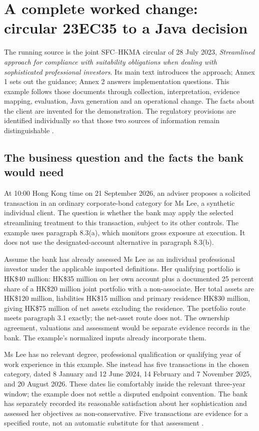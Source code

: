\section{A complete worked change: circular 23EC35 to a Java decision}
\label{sec:dry-run}

The running source is the joint SFC--HKMA circular of 28 July 2023,
\emph{Streamlined approach for compliance with suitability obligations when
dealing with sophisticated professional investors}. Its main text introduces
the approach; Annex 1 sets out the guidance; Annex 2 answers implementation
questions. This example follows those documents through collection,
interpretation, evidence mapping, evaluation, Java generation and an operational
change. The facts about the client are invented for the demonstration. The
regulatory provisions are identified individually so that those two sources of
information remain distinguishable \citep{sfcspi,sfcspiannex1,sfcspiannex2}.

\subsection{The business question and the facts the bank would need}

At 10:00 Hong Kong time on 21 September 2026, an adviser proposes a solicited
transaction in an ordinary corporate-bond category for Ms Lee, a synthetic
individual client. The question is whether the bank may apply the selected
streamlining treatment to this transaction, subject to its other controls.
The example uses paragraph 8.3(a), which monitors gross exposure at execution.
It does not use the designated-account alternative in paragraph 8.3(b).

Assume the bank has already assessed Ms Lee as an individual professional
investor under the applicable imported definitions. Her qualifying portfolio is
HK\$40 million: HK\$35 million on her own account plus a documented 25 percent
share of a HK\$20 million joint portfolio with a non-associate. Her total assets
are HK\$120 million, liabilities HK\$15 million and primary residence HK\$30
million, giving HK\$75 million of net assets excluding the residence. The
portfolio route meets paragraph 3.1 exactly; the net-asset route does not.
The ownership agreement, valuations and assessment would be separate evidence
records in the bank. The example's normalized inputs already incorporate them.

Ms Lee has no relevant degree, professional qualification or qualifying year of
work experience in this example. She instead has five transactions in the
chosen category, dated 8 January and 12 June 2024, 14 February and 7 November
2025, and 20 August 2026. These dates lie comfortably inside the relevant
three-year window; the example does not settle a disputed endpoint convention.
The bank has separately recorded its reasonable satisfaction about her
sophistication and assessed her objectives as non-conservative. Five transactions
are evidence for a specified route, not an automatic substitute for that
assessment \citep[Annex 1, paras.~4.1, 5.1, 7.3]{sfcspiannex1}.

